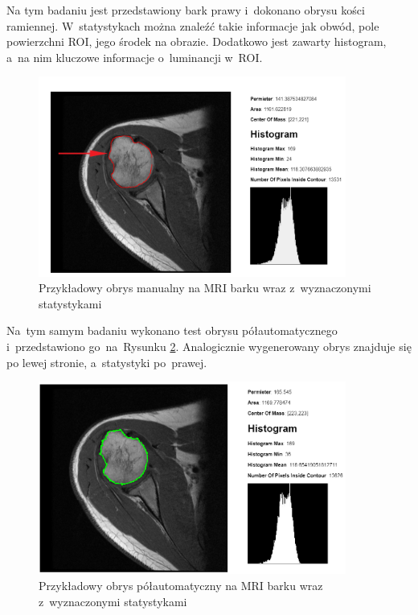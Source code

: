 \documentclass[a4paper,11pt,twoside,openright]{report}
\theoremstyle{definition}
\begin{document}
Na tym badaniu jest przedstawiony bark prawy i~dokonano obrysu kości ramiennej. W~statystykach można
znaleźć takie informacje jak obwód, pole powierzchni ROI, jego środek na obrazie. Dodatkowo jest zawarty
histogram, a~na nim kluczowe informacje o~luminancji w~ROI.

\pagebreak



\begin{figure}[h!]
	\center
	\includegraphics[width=0.9\textwidth]{105b}
	\caption{Przykładowy obrys manualny na MRI barku wraz z~wyznaczonymi statystykami}
    	\label{fig:105}
\end{figure}

Na~tym samym badaniu wykonano test obrysu półautomatycznego i~przedstawiono
go~na~Rysunku \ref{fig:107}. Analogicznie wygenerowany obrys znajduje się po lewej stronie,
a~statystyki po~prawej.

\begin{figure}[h!]
	\center
	\includegraphics[width=0.9\textwidth]{107}
	\caption{Przykładowy obrys półautomatyczny na MRI barku
	wraz z~wyznaczonymi statystykami}
    	\label{fig:107}
\end{figure}
\end{document}
